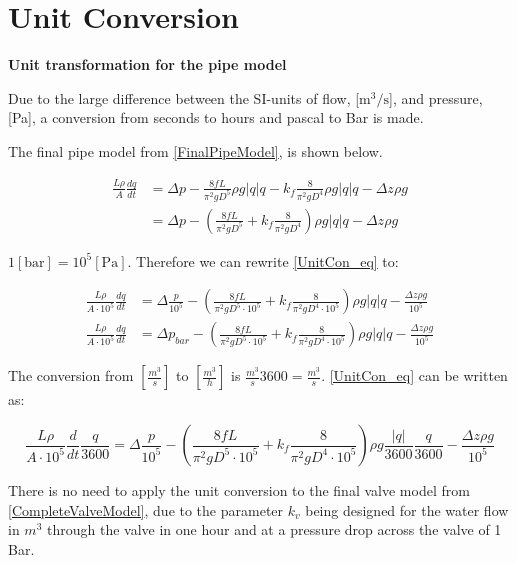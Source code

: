 \chapter{Unit Conversion}
\label{unitCON}
\textbf{Unit transformation for the pipe model}

Due to the large difference between the SI-units of flow, [$\text{m}^3/\text{s}$], and pressure, [Pa], a conversion from seconds to hours and pascal to Bar is made.

The final pipe model from \eqref{FinalPipeModel}, is shown below.   

\begin{equation}
\begin{split}
   \frac{L \rho}{A} \frac{dq}{dt} &=\Delta p - \frac{8fL}{\pi^{2}gD^5} \rho g  |q| q - k_f \frac{8}{\pi^2gD^4} \rho g |q| q - \Delta z \rho g \\
   &=\Delta p - (\frac{8fL}{\pi^{2}gD^5} + k_f \frac{8}{\pi^2gD^4}) \rho g |q| q - \Delta z \rho g
\end{split}
\label{UnitCon_eq}
\end{equation}

$1 [\text{bar}] = 10^5[\text{Pa}]$. Therefore we can rewrite \eqref{UnitCon_eq} to: 

\begin{equation}
\begin{split}
   \frac{L \rho}{A\cdot10^5} \frac{dq}{dt} &= \Delta \frac{p}{10^5} - (\frac{8fL}{\pi^{2}gD^5\cdot10^5} + k_f \frac{8}{\pi^2gD^4\cdot10^5}) \rho g |q| q - \frac{\Delta z \rho g}{10^5}\\
   \frac{L \rho}{A\cdot10^5} \frac{dq}{dt} &= \Delta p_{bar} - (\frac{8fL}{\pi^{2}gD^5\cdot10^5} + k_f \frac{8}{\pi^2gD^4\cdot10^5}) \rho g |q| q - \frac{\Delta z \rho g}{10^5}
\end{split}
\end{equation}

The conversion from $[\frac{m^3}{s}]$ to $[\frac{m^3}{h}]$ is $\frac{m^3}{s} 3600 = \frac{m^3}{s}$. \eqref{UnitCon_eq} can be written as:

\begin{equation}
   \frac{L \rho}{A\cdot10^5} \frac{d}{dt}\frac{q}{3600} = \Delta \frac{p}{10^5} - (\frac{8fL}{\pi^{2}gD^5\cdot10^5} + k_f \frac{8}{\pi^2gD^4\cdot10^5}) \rho g \frac{|q|}{3600} \frac{q}{3600} - \frac{\Delta z \rho g}{10^5}
\end{equation}

There is no need to apply the unit conversion to the final valve model from \eqref{CompleteValveModel}, due to the parameter $k_v$ being designed for the water flow in $m^3$
through the  valve in one hour and at a pressure drop across the valve of 1 Bar. 

